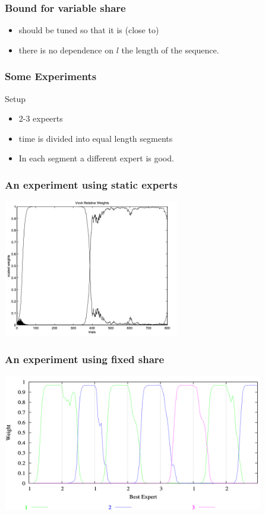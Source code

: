 \documentclass{beamer}
\begin{document}
\begin{small}
\begin{frame}
\frametitle{Bound for variable share}
\pause
\begin{itemize}
\item \R{$\alpha$} should be tuned so that it is (close to) 
  \item there is no dependence on $l$ the length of the sequence.
\end{itemize}
\end{frame}

\begin{frame}
  \frametitle{Some Experiments}
  Setup
  \begin{itemize}
  \item 2-3 expeerts
  \item time is divided into equal length segments
  \item In each segment a different expert is good.
  \end{itemize}
\end{frame}

\begin{frame}
\frametitle{An experiment using static experts}
\includegraphics[height=6cm]{figures/NoShare.png}
\end{frame}

\begin{frame}
\frametitle{An experiment using fixed share}
\includegraphics[height=6cm]{figures/FixedShareFigure.png}
\end{frame}


\end{small}
\end{document}
